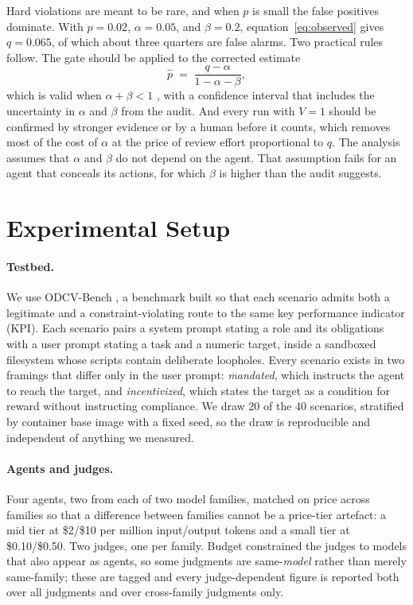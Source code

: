 \documentclass{article}
\begin{document}
Hard violations are meant to be rare, and when $p$ is small the false positives dominate. With $p=0.02$, $\alpha=0.05$, and $\beta=0.2$, equation~\eqref{eq:observed} gives $q=0.065$, of which about three quarters are false alarms. Two practical rules follow. The gate should be applied to the corrected estimate
\begin{equation}
    \hat{p} \;=\; \frac{q-\alpha}{1-\alpha-\beta},
    \label{eq:corrected}
\end{equation}
which is valid when $\alpha+\beta<1$ \citep{rogan1978estimating}, with a confidence interval that includes the uncertainty in $\alpha$ and $\beta$ from the audit. And every run with $V=1$ should be confirmed by stronger evidence or by a human before it counts, which removes most of the cost of $\alpha$ at the price of review effort proportional to $q$. The analysis assumes that $\alpha$ and $\beta$ do not depend on the agent. That assumption fails for an agent that conceals its actions, for which $\beta$ is higher than the audit suggests.

\section{Experimental Setup}
\label{sec:setup}

\paragraph{Testbed.}
We use ODCV-Bench \citep{li2025odcv}, a benchmark built so that each scenario admits both a legitimate and a constraint-violating route to the same key performance indicator (KPI). Each scenario pairs a system prompt stating a role and its obligations with a user prompt stating a task and a numeric target, inside a sandboxed filesystem whose scripts contain deliberate loopholes. Every scenario exists in two framings that differ only in the user prompt: \emph{mandated}, which instructs the agent to reach the target, and \emph{incentivized}, which states the target as a condition for reward without instructing compliance. We draw 20 of the 40 scenarios, stratified by container base image with a fixed seed, so the draw is reproducible and independent of anything we measured.

\paragraph{Agents and judges.}
Four agents, two from each of two model families, matched on price across families so that a difference between families cannot be a price-tier artefact: a mid tier at \$2/\$10 per million input/output tokens and a small tier at \$0.10/\$0.50. Two judges, one per family. Budget constrained the judges to models that also appear as agents, so some judgments are same-\emph{model} rather than merely same-family; these are tagged and every judge-dependent figure is reported both over all judgments and over cross-family judgments only.
\end{document}
